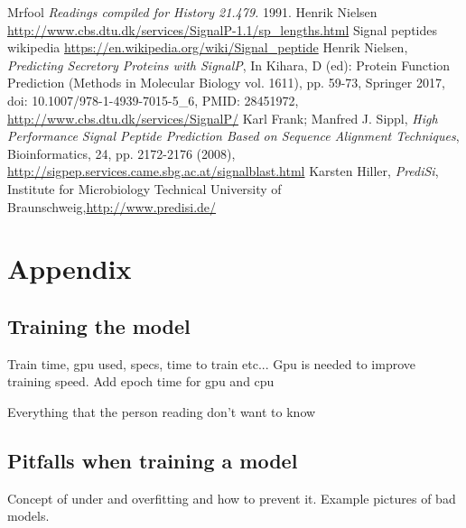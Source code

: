 
\newpage

\begin{thebibliography}{9}
 Mrfool {\em Readings compiled for History 21.479.} 1991.
 Henrik Nielsen \url{http://www.cbs.dtu.dk/services/SignalP-1.1/sp_lengths.html}
 Signal peptides wikipedia \url{https://en.wikipedia.org/wiki/Signal_peptide}
 Henrik Nielsen, {\em Predicting Secretory Proteins with SignalP}, In Kihara, D (ed): Protein Function Prediction (Methods in Molecular Biology vol. 1611),  pp. 59-73, Springer 2017, doi: 10.1007/978-1-4939-7015-5\_6, PMID: 28451972, \url{http://www.cbs.dtu.dk/services/SignalP/}  %
 Karl Frank; Manfred J. Sippl, {\em High Performance Signal Peptide Prediction Based on Sequence Alignment Techniques}, Bioinformatics, 24, pp. 2172-2176 (2008), \url{http://sigpep.services.came.sbg.ac.at/signalblast.html}
  Karsten Hiller,  {\em PrediSi}, Institute for Microbiology Technical University of Braunschweig,\url{http://www.predisi.de/}
\end{thebibliography}


\newpage

\section{Appendix}

\subsection{Training the model}
Train time, gpu used, specs, time to train etc...
Gpu is needed to improve training speed. Add epoch time for gpu and cpu

Everything that the person reading don't want to know


\subsection{Pitfalls when training a model}
Concept of under and overfitting and how to prevent it. Example pictures of bad models.

